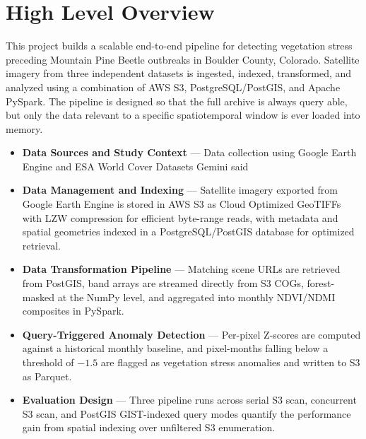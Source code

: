 \section{High Level Overview}
This project builds a scalable end-to-end pipeline for detecting vegetation stress preceding Mountain Pine Beetle outbreaks in Boulder County, Colorado. Satellite imagery from three independent datasets is ingested, indexed, transformed, and analyzed using a combination of AWS S3, PostgreSQL/PostGIS, and Apache PySpark. The pipeline is designed so that the full archive is always query able, but only the data relevant to a specific spatiotemporal window is ever loaded into memory.
\begin{itemize}
    \item \textbf{Data Sources and Study Context} --- Data collection using Google Earth Engine and ESA World Cover Datasets
    Gemini said
    \item \textbf{Data Management and Indexing} --- Satellite imagery exported from Google Earth Engine is stored in AWS S3 as Cloud Optimized GeoTIFFs with LZW compression for efficient byte-range reads, with metadata and spatial geometries indexed in a PostgreSQL/PostGIS database for optimized retrieval.
    \item \textbf{Data Transformation Pipeline} --- Matching scene URLs are retrieved from PostGIS, band arrays are streamed directly from S3 COGs, forest-masked at the NumPy level, and aggregated into monthly NDVI/NDMI composites in PySpark.
    \item \textbf{Query-Triggered Anomaly Detection} --- Per-pixel Z-scores are computed against a historical monthly baseline, and pixel-months falling below a threshold of $-1.5$ are flagged as vegetation stress anomalies and written to S3 as Parquet.
    \item \textbf{Evaluation Design} --- Three pipeline runs across serial S3 scan, concurrent S3 scan, and PostGIS GIST-indexed query modes quantify the performance gain from spatial indexing over unfiltered S3 enumeration.
\end{itemize}